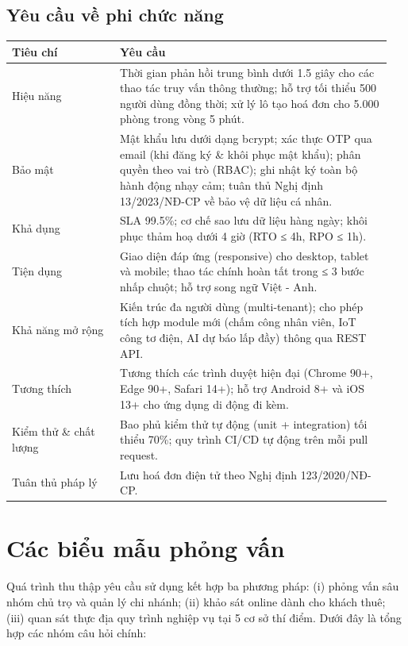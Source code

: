 \subsection{Yêu cầu về phi chức năng}

\begin{longtable}[]{@{}>{\RaggedRight\arraybackslash}p{0.27\linewidth}>{\RaggedRight\arraybackslash}p{0.68\linewidth}@{}}
\toprule
\textbf{Tiêu chí} & \textbf{Yêu cầu}\tabularnewline
\midrule
\endhead
Hiệu năng & Thời gian phản hồi trung bình dưới 1.5 giây cho các thao tác
truy vấn thông thường; hỗ trợ tối thiểu 500 người dùng đồng thời; xử lý
lô tạo hoá đơn cho 5.000 phòng trong vòng 5 phút.\tabularnewline
Bảo mật & Mật khẩu lưu dưới dạng bcrypt; xác thực OTP qua email (khi
đăng ký \& khôi phục mật khẩu); phân quyền theo vai trò (RBAC); ghi nhật
ký toàn bộ hành động nhạy cảm; tuân thủ Nghị định 13/2023/NĐ-CP về bảo
vệ dữ liệu cá nhân.\tabularnewline
Khả dụng & SLA 99.5\%; cơ chế sao lưu dữ liệu hàng ngày; khôi phục thảm
hoạ dưới 4 giờ (RTO ≤ 4h, RPO ≤ 1h).\tabularnewline
Tiện dụng & Giao diện đáp ứng (responsive) cho desktop, tablet và
mobile; thao tác chính hoàn tất trong ≤ 3 bước nhấp chuột; hỗ trợ song
ngữ Việt - Anh.\tabularnewline
Khả năng mở rộng & Kiến trúc đa người dùng (multi-tenant); cho phép tích
hợp module mới (chấm công nhân viên, IoT công tơ điện, AI dự báo lấp
đầy) thông qua REST API.\tabularnewline
Tương thích & Tương thích các trình duyệt hiện đại (Chrome 90+, Edge
90+, Safari 14+); hỗ trợ Android 8+ và iOS 13+ cho ứng dụng di động đi
kèm.\tabularnewline
Kiểm thử \& chất lượng & Bao phủ kiểm thử tự động (unit + integration)
tối thiểu 70\%; quy trình CI/CD tự động trên mỗi pull
request.\tabularnewline
Tuân thủ pháp lý & Lưu hoá đơn điện tử theo Nghị định
123/2020/NĐ-CP.\tabularnewline
\bottomrule
\end{longtable}

\section{Các biểu mẫu phỏng vấn}

Quá trình thu thập yêu cầu sử dụng kết hợp ba phương pháp: (i) phỏng vấn
sâu nhóm chủ trọ và quản lý chi nhánh; (ii) khảo sát online dành cho
khách thuê; (iii) quan sát thực địa quy trình nghiệp vụ tại 5 cơ sở thí
điểm. Dưới đây là tổng hợp các nhóm câu hỏi chính:

